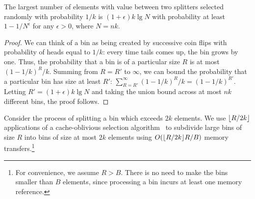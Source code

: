 \begin{lemma}
  The largest number of elements with value between two splitters selected randomly 
  with probability $1/k$ is $(1+\epsilon)k\lg N$ with probability at least 
  $1 - 1/N^\epsilon$ for any $\epsilon > 0$, where $N=nk$.
  \label{lem:max_R}
\end{lemma}
\begin{proof}
  We can think of a bin as being created by successive coin flips with probability
  of heads equal to $1/k$: every time tails comes up, the bin grows by one.  Thus,
  the probability that a bin is of a particular size $R$ is at most $(1-1/k)^R / k$.
  Summing from $R=R'$ to $\infty$, we can bound the probability that a particular
  bin has size at least $R'$: $\sum_{R=R'}^{\infty}(1-1/k)^R/k = (1-1/k)^{R'}$.
  Letting $R'=(1+\epsilon)k\lg N$ and taking the union bound across at most $nk$
  different bins, the proof follows.
\end{proof}

Consider the process of splitting a bin which exceeds $2k$ elements.  We use 
$\mathopen{}\left\lfloor R/2k \right\rfloor\mathclose{}$ applications of a cache-oblivious selection 
algorithm~\cite{FrigoLePr99} to subdivide large bins of size $R$ into bins of 
size at most $2k$ elements using $O(\mathopen{}\left\lfloor R/2k \right\rfloor\mathclose{} R/B)$ memory transfers.\footnote{For
convenience, we assume $R>B$.  There is no need to make the bins smaller than $B$
elements, since processing a bin incurs at least one memory reference.}

